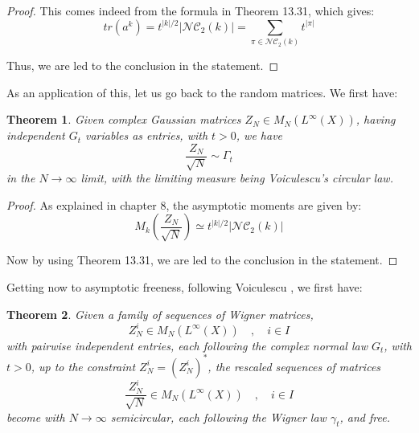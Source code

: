 \documentclass[12pt]{amsbook}
\newtheorem{theorem}{Theorem}[chapter]
\begin{document}
\begin{proof}
This comes indeed from the formula in Theorem 13.31, which gives:
$$tr(a^k)=t^{|k|/2}|\mathcal{NC}_2(k)|=\sum_{\pi\in\mathcal{NC}_2(k)}t^{|\pi|}$$

Thus, we are led to the conclusion in the statement.
\end{proof}

As an application of this, let us go back to the random matrices. We first have:


\begin{theorem}
Given complex Gaussian matrices $Z_N\in M_N(L^\infty(X))$, having independent $G_t$ variables as entries, with $t>0$, we have
$$\frac{Z_N}{\sqrt{N}}\sim\Gamma_t$$
in the $N\to\infty$ limit, with the limiting measure being Voiculescu's circular law.
\end{theorem}

\begin{proof}
As explained in chapter 8, the asymptotic moments are given by:
$$M_k\left(\frac{Z_N}{\sqrt{N}}\right)\simeq t^{|k|/2}|\mathcal{NC}_2(k)|$$

Now by using Theorem 13.31, we are led to the conclusion in the statement.
\end{proof}

Getting now to asymptotic freeness, following Voiculescu \cite{vo3}, we first have:


\begin{theorem}
Given a family of sequences of Wigner matrices, 
$$Z^i_N\in M_N(L^\infty(X))\quad,\quad i\in I$$
with pairwise independent entries, each following the complex normal law $G_t$, with $t>0$, up to the constraint $Z_N^i=(Z_N^i)^*$, the rescaled sequences of matrices
$$\frac{Z^i_N}{\sqrt{N}}\in M_N(L^\infty(X))\quad,\quad i\in I$$
become with $N\to\infty$ semicircular, each following the Wigner law $\gamma_t$, and free.
\end{theorem}
\end{document}
